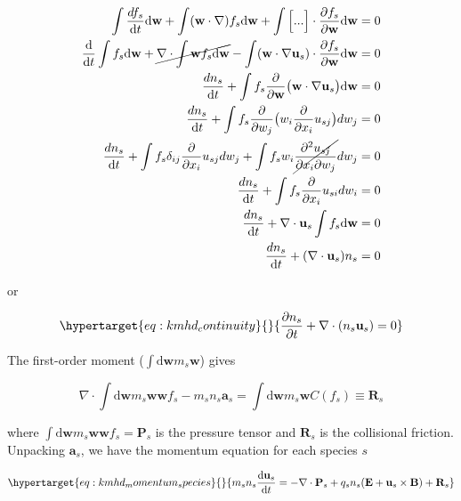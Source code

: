 \documentclass[
  notoc %
]{tufte-book}
\begin{document}
\[
\begin{aligned}
\int \frac{df_s}{\mathrm{d}t} \mathrm{d}\mathbf{w} + \int (\mathbf{w}\cdot\nabla)f_s \mathrm{d}\mathbf{w} + \int \Big[... \Big]\cdot\frac{\partial f_s}{\partial\mathbf{w}} \mathrm{d}\mathbf{w} = 0 \\
\frac{\mathrm{d}}{\mathrm{d}t}\int f_s \mathrm{d}\mathbf{w} + \cancel{\nabla\cdot\int \mathbf{w}f_s \mathrm{d}\mathbf{w}} - \int (\mathbf{w}\cdot\nabla\mathbf{u}_s)\cdot\frac{\partial f_s}{\partial\mathbf{w}} \mathrm{d}\mathbf{w} = 0 \\
\frac{dn_s}{\mathrm{d}t} + \int f_s \frac{\partial}{\partial\mathbf{w}}\big(\mathbf{w}\cdot\nabla\mathbf{u}_s \big)\mathrm{d}\mathbf{w} = 0 \\
\frac{dn_s}{\mathrm{d}t} + \int f_s \frac{\partial}{\partial w_j}\big(w_i \frac{\partial}{\partial x_i}u_{sj} \big)dw_j = 0 \\
\frac{dn_s}{\mathrm{d}t} + \int f_s \delta_{ij}\frac{\partial}{\partial x_i}u_{sj}dw_j + \int f_s  w_i \cancel{\frac{\partial^2 u_{sj}}{\partial x_i \partial w_j}}dw_j = 0 \\
\frac{dn_s}{\mathrm{d}t} + \int f_s \frac{\partial}{\partial x_i}u_{si}dw_i = 0 \\
\frac{dn_s}{\mathrm{d}t} + \nabla\cdot\mathbf{u}_s\int f_s \mathrm{d}\mathbf{w} = 0 \\
\frac{dn_s}{\mathrm{d}t} + (\nabla\cdot\mathbf{u}_s)n_s = 0
\end{aligned}
\]

or

\begin{equation}\protect\hypertarget{eq:kmhd_continuity}{}{
\frac{\partial n_s}{\partial t} + \nabla\cdot(n_s\mathbf{u}_s) = 0
}\label{eq:kmhd_continuity}\end{equation}

The first-order moment (\(\int \mathrm{d}\mathbf{w}m_s\mathbf{w}\))
gives

\[
\nabla\cdot\int \mathrm{d}\mathbf{w}m_s\mathbf{w} \mathbf{w}f_s - m_sn_s\mathbf{a}_s = \int \mathrm{d}\mathbf{w}m_s\mathbf{w}C(f_s) \equiv \mathbf{R}_s
\]

where
\(\int \mathrm{d}\mathbf{w}m_s\mathbf{w} \mathbf{w}f_s = \mathbf{P}_s\)
is the pressure tensor and \(\mathbf{R}_s\) is the collisional friction.
Unpacking \(\mathbf{a}_s\), we have the momentum equation for each
species \(s\)

\begin{equation}\protect\hypertarget{eq:kmhd_momentum_species}{}{
m_sn_s\frac{\mathrm{d}\mathbf{u}_s}{\mathrm{d}t} = -\nabla\cdot\mathbf{P}_s + q_s n_s(\mathbf{E} +\mathbf{u}_s\times\mathbf{B}) + \mathbf{R}_s
}\label{eq:kmhd_momentum_species}\end{equation}
\end{document}
